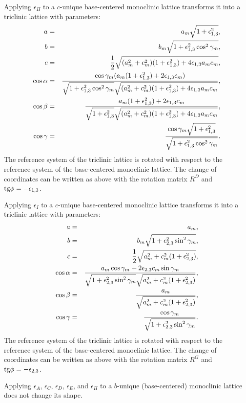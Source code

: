 \documentclass[12pt,a4paper]{article}
\begin{document}
Applying $\epsilon_H$ to a $c$-unique base-centered monoclinic lattice 
transforms it into a triclinic lattice with parameters:
\begin{eqnarray}
a&=&a_m \sqrt{1+\epsilon_{1,3}^2}, \\
b&=&b_m \sqrt{1+\epsilon_{1,3}^2 \cos^2\gamma_m}, \\
c&=&{1\over 2} \sqrt{(a_m^2+c_m^2)(1+\epsilon_{1,3}^2)+4\epsilon_{1,3}a_mc_m},\\
\cos\alpha &=& {\cos\gamma_m (a_m (1+\epsilon_{1,3}^2)+2\epsilon_{1,3}c_m) 
\over 
\sqrt{1+\epsilon_{1,3}^2 \cos^2\gamma_m} \sqrt{(a_m^2+c_m^2)(1+\epsilon_{1,3}^2)+4\epsilon_{1,3}a_mc_m}}, \\
\cos\beta &=& {a_m (1+\epsilon_{1,3}^2)+2\epsilon_{1,3}c_m 
\over 
\sqrt{1+\epsilon_{1,3}^2} \sqrt{(a_m^2+c_m^2)(1+\epsilon_{1,3}^2)+4\epsilon_{1,3}a_mc_m}}, \\
\cos\gamma &=& {\cos\gamma_m \sqrt{1+\epsilon_{1,3}^2} \over
\sqrt{1+\epsilon_{1,3}^2 \cos^2\gamma_m}}.
\end{eqnarray}
The reference system of the triclinic lattice is rotated 
with respect to the reference system of the base-centered
monoclinic lattice. 
The change of coordinates can be written as above with the rotation matrix 
$R^D$ and ${\rm tg}\phi=-\epsilon_{1,3}$.

Applying $\epsilon_I$ to a $c$-unique base-centered monoclinic lattice 
transforms it into a triclinic lattice with parameters:
\begin{eqnarray}
a&=&a_m, \\
b&=&b_m \sqrt{1+\epsilon_{2,3}^2 \sin^2\gamma_m}, \\
c&=&{1\over 2} \sqrt{a_m^2+c_m^2(1+\epsilon_{2,3}^2)},\\
\cos\alpha &=& {a_m\cos\gamma_m +2\epsilon_{2,3}c_m \sin \gamma_m 
\over 
\sqrt{1+\epsilon_{2,3}^2 \sin^2\gamma_m} 
\sqrt{a_m^2+c_m^2(1+\epsilon_{2,3}^2)}}, \\
\cos\beta &=& {a_m  
\over 
\sqrt{a_m^2+c_m^2(1+\epsilon_{2,3}^2)}}, \\
\cos\gamma &=& {\cos\gamma_m \over
\sqrt{1+\epsilon_{2,3}^2 \sin^2\gamma_m}}.
\end{eqnarray}
The reference system of the triclinic lattice is rotated 
with respect to the reference system of the base-centered
monoclinic lattice. 
The change of coordinates can be written as above with the rotation matrix 
$R^G$ and ${\rm tg}\phi=-\epsilon_{2,3}$.

Applying $\epsilon_A$, $\epsilon_C$, $\epsilon_D$, $\epsilon_E$, and
$\epsilon_H$ to a $b$-unique (base-centered) monoclinic lattice
does not change its shape.
\end{document}
